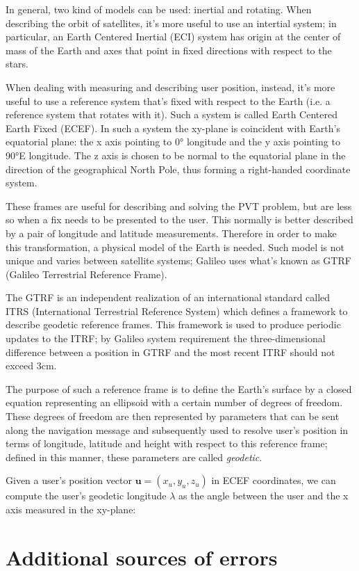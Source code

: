 \par

In general, two kind of models can be used: inertial and rotating. When
describing the orbit of satellites, it's more useful to use an intertial system;
in particular, an Earth Centered Inertial (ECI) system has origin at the center
of mass of the Earth and axes that point in fixed directions with respect to the
stars.

When dealing with measuring and describing user position, instead, it's more
useful to use a reference system that's fixed with respect to the Earth (i.e. a
reference system that rotates with it). Such a system is called Earth Centered
Earth Fixed (ECEF). In such a system the xy-plane is coincident with Earth's
equatorial plane: the x axis pointing to 0° longitude and the y axis pointing to
90°E longitude. The z axis is chosen to be normal to the equatorial plane in the
direction of the geographical North Pole, thus forming a right-handed coordinate
system.

These frames are useful for describing and solving the PVT problem, but are less
so when a fix needs to be presented to the user. This normally is better
described by a pair of longitude and latitude measurements. Therefore in order
to make this transformation, a physical model of the Earth is needed. Such model
is not unique and varies between satellite systems; Galileo uses what's known as
GTRF (Galileo Terrestrial Reference Frame).

The GTRF is an independent realization of an international standard called ITRS
(International Terrestrial Reference System) which defines a framework to
describe geodetic reference frames. This framework is used to produce periodic
updates to the ITRF; by Galileo system requirement the
three-dimensional difference between a position in GTRF and the most recent ITRF
should not exceed 3cm.

The purpose of such a reference frame is to define the Earth's surface by a
closed equation representing an ellipsoid with a certain number of degrees of
freedom. These degrees of freedom are then represented by parameters that can be
sent along the navigation message and subsequently used to resolve user's
position in terms of longitude, latitude and height with respect to this
reference frame; defined in this manner, these parameters are called
\textit{geodetic}.

Given a user's position vector $\bm{u} = (x_u, y_u, z_u)$ in ECEF coordinates,
we can compute the user's geodetic longitude $\lambda$ as the angle between the
user and the x axis measured in the xy-plane:

\section{Additional sources of errors}
